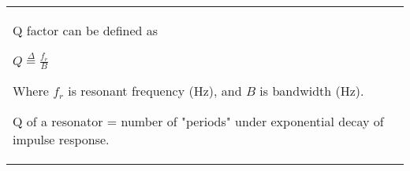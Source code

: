 \begin{tabular}{@{}L@{}}
Q factor can be defined as 

$Q \stackrel{\Delta}{=} \frac{f_r}{B}$

Where $f_r$ is resonant frequency (Hz), and $B$ is bandwidth (Hz). 

Q of a resonator = number of "periods" under exponential decay
of impulse response.
\end{tabular}
